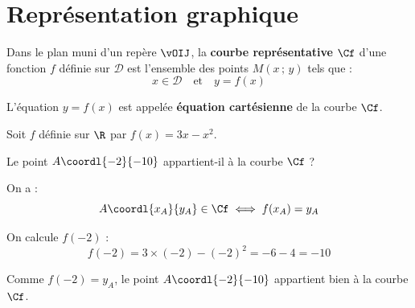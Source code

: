 \section{Représentation graphique}

\begin{defin}
	Dans le plan muni d'un repère $\vOIJ$, la \textbf{courbe représentative} $\Cf$ d'une fonction $f$ définie sur $\mathcal{D}$ est l'ensemble des points $M(x\,;\,y)$ tels que :
	\[
		x \in \mathcal{D} \quad \text{et} \quad y = f(x)
	\]

	L'équation $y = f(x)$ est appelée \textbf{équation cartésienne} de la courbe $\Cf$.
\end{defin}

\begin{methode}
	Soit $f$ définie sur $\R$ par $f(x) = 3x - x^2$.

	Le point $A\coordl{-2}{-10}$ appartient-il à la courbe $\Cf$ ?

	\begin{correction}
		On a :
		\[
			A\coordl{x_A}{y_A} \in \Cf \iff f(x_A) = y_A
		\]

		On calcule $f(-2)$ :
		\[
			f(-2) = 3 \times (-2) - (-2)^2 = -6 - 4 = -10
		\]

		Comme $f(-2) = y_A$, le point $A\coordl{-2}{-10}$ appartient bien à la courbe $\Cf$.
	\end{correction}
\end{methode}

